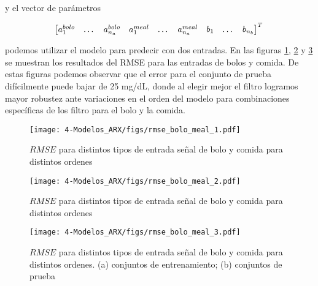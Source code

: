 y el vector de parámetros

\begin{equation}
	\begin{bmatrix}
	a_1^{bolo} & \dots & a_{n_a}^{bolo} & a_1^{meal} & \dots & a_{n_a}^{meal} & b_1 & \dots & b_{n_b}
	\end{bmatrix}^T\\
\end{equation}

podemos utilizar el modelo para predecir con dos entradas. En las figuras \ref{fig:rmse_bolo_meal_1}, \ref{fig:rmse_bolo_meal_2} y \ref{fig:rmse_bolo_meal_3} se muestran los resultados del RMSE para las entradas de bolos y comida. De estas figuras podemos observar que el error para el conjunto de prueba difícilmente puede bajar de 25 mg/dL, donde al elegir mejor el filtro logramos mayor robustez ante variaciones en el orden del modelo para combinaciones específicas de los filtro para el bolo y la comida.


\begin{figure}[H]
	\centering
	\texttt{[image: 4-Modelos\_ARX/figs/rmse\_bolo\_meal\_1.pdf]}
	\caption{$RMSE$ para distintos tipos de entrada señal de bolo y comida para distintos ordenes}
	\label{fig:rmse_bolo_meal_1}
\end{figure}

\begin{figure}[H]
	\centering
	\texttt{[image: 4-Modelos\_ARX/figs/rmse\_bolo\_meal\_2.pdf]}
	\caption{$RMSE$ para distintos tipos de entrada señal de bolo y comida para distintos ordenes}
	\label{fig:rmse_bolo_meal_2}
\end{figure}

\begin{figure}[H]
	\centering
	\texttt{[image: 4-Modelos\_ARX/figs/rmse\_bolo\_meal\_3.pdf]}
	\caption{$RMSE$ para distintos tipos de entrada señal de bolo y comida para distintos ordenes. (a) conjuntos de entrenamiento; (b) conjuntos de prueba}
	\label{fig:rmse_bolo_meal_3}
\end{figure}


